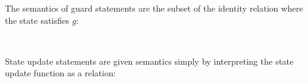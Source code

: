 \documentclass[sigplan]{acmart}%
\begin{document}
The semantics of guard statements
\AgdaSpace{}%
\AgdaSpace{}%
\AgdaSpace{}%
are the subset of the identity relation where the 
state satisfies $g$:\nopagebreak
\begin{code}
\>[2]\AgdaSpace{}%
\AgdaSymbol{:}%
\>[10]\AgdaSpace{}%
\AgdaSpace{}%
\<%
\\
%
\>[2]\AgdaSpace{}%
\AgdaSpace{}%
\AgdaSpace{}%
\AgdaSpace{}%
\AgdaSpace{}%
\AgdaSymbol{=}\AgdaSpace{}%
\AgdaSpace{}%
\AgdaSpace{}%
\AgdaSpace{}%
\AgdaSpace{}%
\AgdaSpace{}%
\AgdaSpace{}%
\AgdaSpace{}%
\<%
\end{code}
State update statements are given semantics simply by 
interpreting the state update function as a relation:
\begin{code}
\>[2]\AgdaSpace{}%
\AgdaSymbol{:}\AgdaSpace{}%
\AgdaSymbol{(}\AgdaSpace{}%
\AgdaSpace{}%
\AgdaSpace{}%
\AgdaSpace{}%
\AgdaSymbol{)}\AgdaSpace{}%
\AgdaSpace{}%
\<%
\\
%
\>[2]\AgdaSpace{}%
\AgdaSpace{}%
\AgdaSpace{}%
\AgdaSymbol{=}\AgdaSpace{}%
\AgdaSpace{}%
\AgdaSpace{}%
%
\>[473I]\AgdaSpace{}%
\AgdaSpace{}%
\AgdaOperator{\AgdaInductiveConstructor{,}}\AgdaSpace{}%
\AgdaSymbol{\AgdaUnderscore{}}\AgdaSpace{}%
\AgdaSymbol{=}\AgdaSpace{}%
\AgdaSpace{}%
\AgdaSymbol{(}\AgdaSpace{}%
\AgdaOperator{\AgdaInductiveConstructor{,}}\AgdaSpace{}%
\AgdaSymbol{)}\<%
\\
\>[473I][@{}l@{\AgdaIndent{0}}]%
%
\>[32]\!\!\AgdaSpace{}%
\AgdaSpace{}%
\<%
\end{code}
\end{document}
